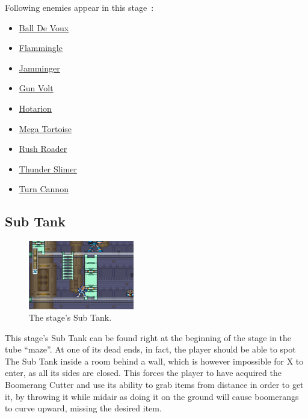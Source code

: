 Following enemies appear in this stage~\cite{wiki:Power_plant}:
\begin{itemize}
	\item \hyperlink{enem:Ball_De_Voux}{Ball De Voux}
	\item \hyperlink{enem:Flammingle}{Flammingle}
	\item \hyperlink{enem:Jamminger}{Jamminger}
	\item \hyperlink{enem:Gun_Volt}{Gun Volt}
	\item \hyperlink{enem:Hotarion}{Hotarion}
	\item \hyperlink{enem:Mega_Tortoise}{Mega Tortoise}
	\item \hyperlink{enem:Rush_Roader}{Rush Roader}
	\item \hyperlink{miniboss:Thunder_Slimer}{Thunder Slimer}
	\item \hyperlink{enem:Turn_Cannon}{Turn Cannon}
\end{itemize}

\subsection{Sub Tank}
\begin{figure}[htp]
	\centering
	\includegraphics[height=3cm]{figures/X1/Spark_mandrill/Mandrill_tank.jpg}
	\caption{The stage's Sub Tank.}
\end{figure}
This stage's Sub Tank can be found right at the beginning of the stage in the tube ``maze''. At one of its dead ends, in fact, the player should be able to spot The Sub Tank inside a room behind a wall, which is however impossible for X to enter, as all its sides are closed. This forces the player to have acquired the Boomerang Cutter and use its ability to grab items from distance in order to get it, by throwing it while midair as doing it on the ground will cause boomerangs to curve upward, missing the desired item.

